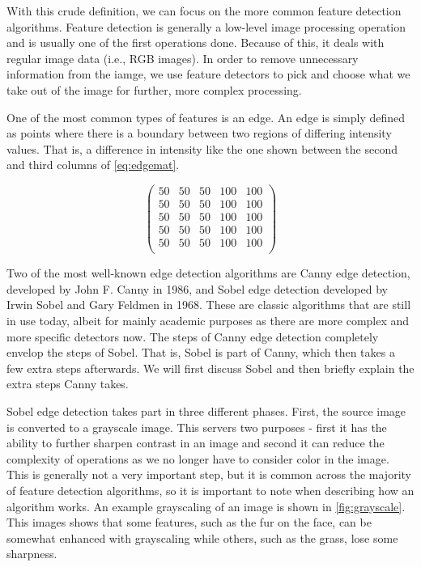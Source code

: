 \documentclass[12pt]{article}
\begin{document}
			With this crude definition, we can focus on the more common feature detection algorithms. Feature detection is generally a low-level image processing operation and is usually one of the first operations done. Because of this, it deals with regular image data (i.e., RGB images). In order to remove unnecessary information from the iamge, we use feature detectors to pick and choose what we take out of the image for further, more complex processing.

			One of the most common types of features is an edge. An edge is simply defined as points where there is a boundary between two regions of differing intensity values. That is, a difference in intensity like the one shown between the second and third columns of \eqref{eq:edgemat}. 

			\begin{equation}
				\begin{pmatrix}
					\label{eq:edgemat}
					50	& 50	& 50	& 100	& 100 \\
					50	& 50	& 50	& 100	& 100 \\
					50	& 50	& 50	& 100	& 100 \\
					50	& 50	& 50	& 100	& 100 \\
					50	& 50	& 50	& 100	& 100 \\
				\end{pmatrix}
			\end{equation}

			Two of the most well-known edge detection algorithms are Canny edge detection, developed by John F. Canny in 1986, and Sobel edge detection developed by Irwin Sobel and Gary Feldmen in 1968. These are classic algorithms that are still in use today, albeit for mainly academic purposes as there are more complex and more specific detectors now. The steps of Canny edge detection completely envelop the steps of Sobel. That is, Sobel is part of Canny, which then takes a few extra steps afterwards. We will first discuss Sobel and then briefly explain the extra steps Canny takes.

			Sobel edge detection takes part in three different phases. First, the source image is converted to a grayscale image. This servers two purposes - first it has the ability to further sharpen contrast in an image and second it can reduce the complexity of operations as we no longer have to consider color in the image. This is generally not a very important step, but it is common across the majority of feature detection algorithms, so it is important to note when describing how an algorithm works. An example grayscaling of an image is shown in \autoref{fig:grayscale}. This images shows that some features, such as the fur on the face, can be somewhat enhanced with grayscaling while others, such as the grass, lose some sharpness.
\end{document}
